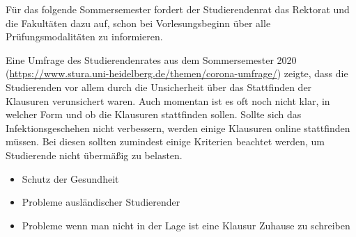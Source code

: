 {            Für das folgende Sommersemester fordert der Studierendenrat das Rektorat und die
            Fakultäten dazu
            auf, schon bei Vorlesungsbeginn über alle Prüfungsmodalitäten zu informieren.
        }{
            Eine Umfrage des Studierendenrates aus dem Sommersemester 2020 (\url{https://www.stura.uni-heidelberg.de/themen/corona-umfrage/}) zeigte, dass die Studierenden vor
            allem durch die Unsicherheit über das Stattfinden der Klausuren verunsichert waren. Auch momentan
            ist es oft noch nicht klar, in welcher Form und ob die Klausuren stattfinden sollen.
            Sollte sich das Infektionsgeschehen nicht verbessern, werden einige Klausuren online stattfinden
            müssen. Bei diesen sollten zumindest einige Kriterien beachtet werden, um Studierende nicht
            übermäßig zu belasten.
            \begin{itemize}
                \item Schutz der Gesundheit
                \item Probleme ausländischer Studierender
                \item Probleme wenn man nicht in der Lage ist eine Klausur Zuhause zu schreiben
            \end{itemize}
        }{
            \ul{}
        }{
        }
        
